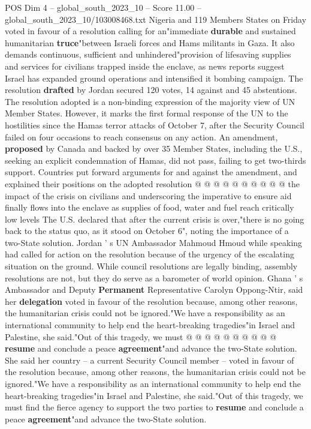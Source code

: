 \begin{textsample}{POS Dim 4 – global\_south\_2023\_10 – Score 11.00 – global\_south\_2023\_10/103008468.txt}  \label{ex:f4_pos_438}
Nigeria and 119 Members States on Friday voted in favour of a resolution calling for an"immediate \textbf{durable} and sustained humanitarian \textbf{truce}"between Israeli forces and Hams militants in Gaza.
It also demands continuous, sufficient and unhindered"provision of lifesaving supplies and services for civilians trapped inside the enclave, as news reports suggest Israel has expanded ground operations and intensified it bombing campaign.
The resolution \textbf{drafted} by Jordan secured 120 votes, 14 against and 45 abstentions.
The resolution adopted is a non-binding expression of the majority view of UN Member States.
However, it marks the first formal response of the UN to the hostilities since the Hamas terror attacks of October 7, after the Security Council failed on four occasions to reach consensus on any action.
An amendment, \textbf{proposed} by Canada and backed by over 35 Member States, including the U.S., seeking an explicit condemnation of Hamas, did not pass, failing to get two-thirds support.
Countries put forward arguments for and against the amendment, and explained their positions on the adopted resolution @ @ @ @ @ @ @ @ @ @ the impact of the crisis on civilians and underscoring the imperative to ensure aid finally flows into the enclave as supplies of food, water and fuel reach critically low levels The U.S. declared that after the current crisis is over,"there is no going back to the status quo, as it stood on October 6", noting the importance of a two-State solution.
Jordan ' s UN Ambassador Mahmoud Hmoud while speaking had called for action on the resolution because of the urgency of the escalating situation on the ground.
While council resolutions are legally binding, assembly resolutions are not, but they do serve as a barometer of world opinion.
Ghana ' s Ambassador and Deputy \textbf{Permanent} Representative Carolyn Oppong-Ntir, said her \textbf{delegation} voted in favour of the resolution because, among other reasons, the humanitarian crisis could not be ignored."We have a responsibility as an international community to help end the heart-breaking tragedies"in Israel and Palestine, she said."Out of this tragedy, we must @ @ @ @ @ @ @ @ @ @ \textbf{resume} and conclude a peace \textbf{agreement}"and advance the two-State solution.
She said her country -- a current Security Council member -- voted in favour of the resolution because, among other reasons, the humanitarian crisis could not be ignored."We have a responsibility as an international community to help end the heart-breaking tragedies"in Israel and Palestine, she said."Out of this tragedy, we must find the fierce agency to support the two parties to \textbf{resume} and conclude a peace \textbf{agreement}"and advance the two-State solution.

\end{textsample}
